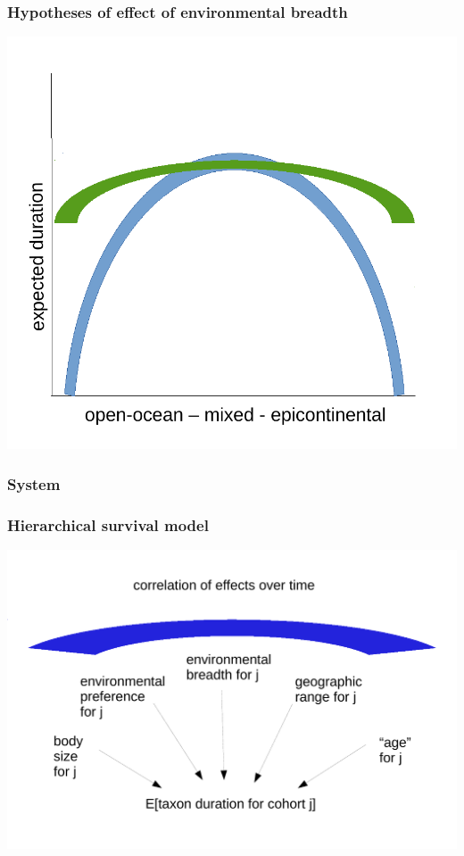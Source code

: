 \documentclass{beamer}
\begin{document}
\begin{frame}
  \frametitle{Hypotheses of effect of environmental breadth}
  \begin{center}
    \includegraphics[width = \textwidth,height = 0.8\textheight,keepaspectratio = true]{figure/selection_breadth}
  \end{center}
\end{frame}

\begin{frame}
  \frametitle{System}
\end{frame}

\begin{frame}
  \frametitle{Hierarchical survival model}
  \begin{center}
    \includegraphics[width = \textwidth,height = 0.8\textheight,keepaspectratio = true]{figure/simple_model}
  \end{center}
\end{frame}
\end{document}
